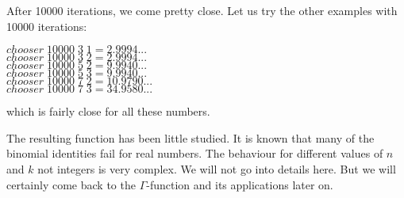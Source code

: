 \documentclass[tikz]{scrreprt}
\newcommand{\Varid}[1]{\mathit{#1}}
\begin{document}
After \num{10000} iterations, we come pretty close.
Let us try the other examples with \num{10000} iterations:

\begin{minipage}{\textwidth}
\ensuremath{\Varid{chooser}\;\mathrm{10000}\;\mathrm{3}\;\mathrm{1}\mathrel{=}\mathrm{2.9994}\mathbin{...}}\\
\ensuremath{\Varid{chooser}\;\mathrm{10000}\;\mathrm{3}\;\mathrm{2}\mathrel{=}\mathrm{2.9994}\mathbin{...}}\\
\ensuremath{\Varid{chooser}\;\mathrm{10000}\;\mathrm{5}\;\mathrm{2}\mathrel{=}\mathrm{9.9940}\mathbin{...}}\\
\ensuremath{\Varid{chooser}\;\mathrm{10000}\;\mathrm{5}\;\mathrm{3}\mathrel{=}\mathrm{9.9940}\mathbin{...}}\\
\ensuremath{\Varid{chooser}\;\mathrm{10000}\;\mathrm{7}\;\mathrm{2}\mathrel{=}\mathrm{10.9790}\mathbin{...}}\\
\ensuremath{\Varid{chooser}\;\mathrm{10000}\;\mathrm{7}\;\mathrm{3}\mathrel{=}\mathrm{34.9580}\mathbin{...}}
\end{minipage}

which is fairly close for all these numbers.

The resulting function has been little studied.
It is known that many of the binomial identities
fail for real numbers. The behaviour for different
values of $n$ and $k$ not integers is very complex.
We will not go into details here. But we will certainly
come back to the $\Gamma$-function and its applications later on.


\end{document}
